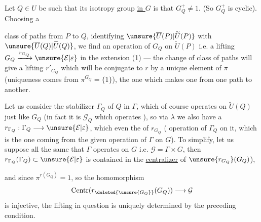 Let  $Q\in U$ be such that its isotropy group   \uline{in $G$} is  that $G_Q^+\ne1$.
(So $G_Q^+$ is cyclic). Choosing a


class of paths \inserted{$\lambda$} from $P$ to $Q$, identifying $\unsure{\overline U(P)|\widetilde U(P)}$ with $\unsure{\overline U(Q)|\widetilde U(Q)}$, we find an operation of $G_Q$ on $\widetilde U(P)$ i.e. a lifting $G_Q\xrightarrow{r_{G_Q}}\unsure{\mathcal E|\varepsilon}$ in the extension (1) --- the change of class of paths  will give a lifting $r'_{G_Q}$ which  will be conjugate to $r$ by a unique element of $\pi$  (uniqueness comes from $\pi^{G_Q}=\{1\}$),  the one which makes one  from one path to another.

Let us consider the stabilizer $\Gamma_Q$ of $Q$ in $\Gamma$,  which of course operates on $\widetilde U(Q)$ just like $G_Q$ (in fact it is $\mathcal G_Q$ which operates  \unsure{\dots}), so via $\lambda$ we also have a  $r_{\Gamma_Q}:\Gamma_Q\longrightarrow\unsure{\mathcal E|\varepsilon}$, which  even the  of  $r_{G_Q}$ ( operation of  $\Gamma_Q$ on it, which is the one coming from the given operation of $\Gamma$ on $G$).
To simplify, let us suppose all the same that $\Gamma$ operates  on $G$ i.e. $\mathcal G=\Gamma\times G$, then $r_{\Gamma_Q}(\Gamma_Q)\subset\unsure{\mathcal E|\varepsilon}$ is contained in the \uline{centralizer} of  $\unsure{r_{G_Q}}(G_Q)$),


and since $\pi^{r(G_Q)}=1$, so the homomorphism
\[
\operatorname{Centr}(r_{\deleted{\unsure{G_Q}}}(G_Q))\longrightarrow\mathcal G
\]
is injective, the lifting in question  is uniquely determined by the preceding condition.

